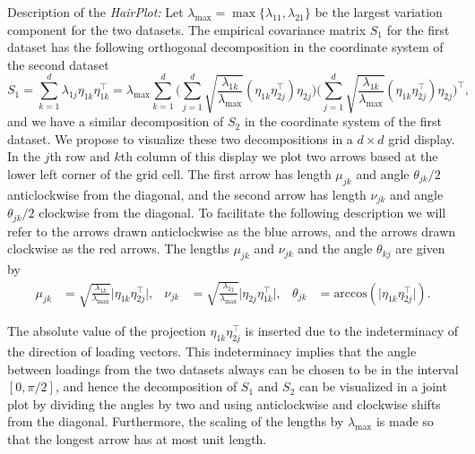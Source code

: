 \documentclass[titlepage,11pt,twoside]{article}
\newcommand{\acos}{\text{arccos}}
\begin{document}
Description of the \emph{HairPlot:} Let $\lambda_{\max} = \max\{ \lambda_{11}, \lambda_{21} \}$ be the largest variation component for the two datasets. The empirical covariance matrix $S_1$ for the first dataset has the following orthogonal decomposition in the coordinate system of the second dataset
\begin{equation*}
S_1 = \sum_{k=1}^d \lambda_{1j} \eta_{1k} \eta_{1k}^\top
= \lambda_{\max} \sum_{k=1}^d
\Bigg( \sum_{j=1}^d \sqrt{\frac{\lambda_{1k}}{\lambda_{\max}}} (\eta_{1k} \eta_{2j}^\top) \eta_{2j} \Bigg)
\Bigg( \sum_{j=1}^d \sqrt{\frac{\lambda_{1k}}{\lambda_{\max}}} (\eta_{1k} \eta_{2j}^\top) \eta_{2j} \Bigg)^\top,
\end{equation*}
and we have a similar decomposition of $S_2$ in the coordinate system of the first dataset. We propose to visualize these two decompositions in a $d \times d$ grid display. In the $j$th row and $k$th column of this display we plot two arrows based at the lower left corner of the grid cell. The first arrow has length $\mu_{jk}$ and angle $\theta_{jk}/2$ anticlockwise from the diagonal, and the second arrow has length $\nu_{jk}$ and angle $\theta_{jk}/2$ clockwise from the diagonal. To facilitate the following description we will refer to the arrows drawn anticlockwise as the blue arrows, and the arrows drawn clockwise as the red arrows. The lengths $\mu_{jk}$ and $\nu_{jk}$ and the angle $\theta_{kj}$ are given by
\begin{align*}
\mu_{jk} &= \sqrt{\frac{\lambda_{1k}}{\lambda_{\max}}} \lvert \eta_{1k} \eta_{2j}^\top \rvert, &
\nu_{jk} &= \sqrt{\frac{\lambda_{2j}}{\lambda_{\max}}} \lvert \eta_{2j} \eta_{1k}^\top \rvert, &
\theta_{jk} &= \acos(\lvert \eta_{1k} \eta_{2j}^\top \rvert).
\end{align*}

The absolute value of the projection $\eta_{1k} \eta_{2j}^\top$ is inserted due to the indeterminacy of the direction of loading vectors. This indeterminacy implies that the angle between loadings from the two datasets always can be chosen to be in the interval $[0,\pi/2]$, and hence the decomposition of $S_1$ and $S_2$ can be visualized in a joint plot by dividing the angles by two and using anticlockwise and clockwise shifts from the diagonal. Furthermore, the scaling of the lengths by $\lambda_{\max}$ is made so that the longest arrow has at most unit length.
\end{document}
